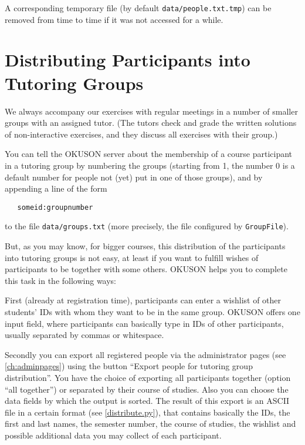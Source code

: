 \documentclass[12pt,openany,a4paper]{book}
\newcommand{\OKUSON}{\textsf{OKUSON}}
\begin{document}
A corresponding temporary file (by default \texttt{data/people.txt.tmp}) can
be removed from time to time if it was not accessed for a while.

\section{Distributing Participants into Tutoring Groups}\label{sec:groups}

We always accompany our exercises with regular meetings in a number of 
smaller groups with an assigned tutor. (The tutors check and grade the written
solutions of non-interactive exercises, and they discuss all exercises with
their group.)

You can tell the {\OKUSON} server about the membership of a course
participant in a tutoring group by numbering the groups (starting from 1,
the number 0 is a default number for people not (yet) put in one of those
groups), and by appending a line of the form

\verb+   someid:groupnumber+

to the file \texttt{data/groups.txt} (more precisely, the file configured
by \texttt{GroupFile}).

But, as you may know, for bigger courses, this distribution 
of the participants into tutoring groups is not easy, at least if you
want to fulfill wishes of participants to be together with some others.
{\OKUSON} helps you to complete this task in the following ways:

First (already at registration time), participants can enter a wishlist
of other students' IDs with whom they want to be in the same group. {\OKUSON}
offers one input field, where participants can basically type in IDs of
other participants, usually separated by commas or whitespace.

Secondly you can export all registered people via the administrator pages 
(see \ref{ch:adminpages}) using the button ``Export people for tutoring group
distribution''. You have the choice of exporting all participants together
(option ``all together'') or separated by their course of studies. Also you
can choose the data fields by which the output is sorted. The result
of this export is an ASCII file in a certain format (see
\ref{distribute.py}), that contains basically the IDs, the first and
last names, the semester number, the course of studies, the wishlist and
possible additional data you may collect of each participant.
\end{document}
